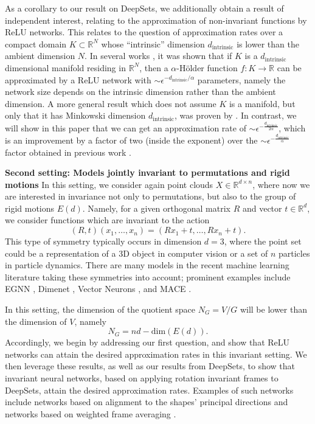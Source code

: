 \documentclass[twoside,11pt]{article}
\newcommand{\RR}{\mathbb{R}}
\newcommand{\dint}{d_{\text{intrinsic}}}
\begin{document}
As a corollary to our result on DeepSets, we additionally obtain a result of independent interest, relating to the approximation of non-invariant functions by ReLU networks. This relates to the question of approximation rates over a compact domain $K\subset \RR^N $ whose ``intrinsic'' dimension $\dint $ is lower than the ambient dimension $N$. In several works \citep{shaham2018provable,chen2019efficient,labate2024low}, it was shown that if $K$ is a $\dint$ dimensional manifold residing in $\RR^N$,  then a $\alpha$-H\"older function $f:K \to \RR$ can be approximated by a ReLU network with $\sim \epsilon^{-\dint/\alpha}$ parameters, namely the network size depends  on the intrinsic dimension rather than the ambient dimension. A more general result which does not assume $K$ is a manifold, but only that it has  Minkowski dimension $\dint$, was proven by \cite{nakada2020adaptive}. In contrast,  we will show in this paper that we can  get an approximation rate of $\sim \epsilon^{-\frac{d_{\text{intrinsic}}}{2\alpha}}$, which is an improvement by a factor of two (inside the exponent) over the $\sim \epsilon^{-\frac{d_{\text{intrinsic}}}{\alpha}}$ factor obtained in previous work \citep{nakada2020adaptive}.


\textbf{Second setting: Models jointly invariant to permutations and rigid motions}
In this setting, we consider again point clouds $X\in \RR^{d\times n} $, where now we are interested in invariance not only to permutations, but also to the group of rigid motions $E(d) $. Namely, for a given orthogonal matrix $R$ and vector $t\in \RR^d$, we consider functions which are  invariant  to the action
	$$(R,t)\left(x_1,\ldots,x_n \right)=\left(Rx_1+t,\ldots,Rx_n+t \right) .$$
This type of symmetry typically occurs in dimension $d=3$, where the point set could be a representation of a 3D object in computer vision or a set of $n$ particles in particle dynamics.  There are many models in the recent machine learning literature taking these symmetries into account; prominent examples include EGNN \citep{satorras2021n}, Dimenet \citep{gasteiger2020directional}, Vector Neurons \citep{vn}, and MACE \citep{MACE}.  


In this setting, the dimension of the quotient space $N_G=V/G $ will be lower than the dimension of $V$, namely 
$$N_G=nd-\mathrm{dim}(E(d)).$$
 Accordingly, we begin by addressing our first question, and show that  ReLU networks can attain the desired  approximation rates in this invariant setting. We then leverage these results, as well as our results from DeepSets, to show that invariant neural networks, based on applying rotation invariant frames to DeepSets, attain the desired approximation rates. Examples of such networks include networks based on alignment to the shapes' principal directions \citep{punyframe} and networks based on weighted frame averaging \citep{pozdnyakov2023smooth,dym2024equivariant}.  
\end{document}

